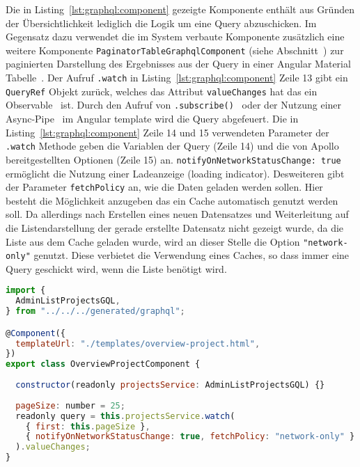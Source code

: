 Die in Listing~\ref{lst:graphql:component} gezeigte Komponente enthält aus Gründen der Übersichtlichkeit lediglich die Logik um eine Query abzuschicken. Im Gegensatz dazu verwendet die im System verbaute Komponente zusätzlich eine weitere Komponente \lstinline|PaginatorTableGraphqlComponent| (siehe Abschnitt~) zur paginierten Darstellung des Ergebnisses aus der Query in einer Angular Material Tabelle~\cite{angular-material-table}.
Der Aufruf \lstinline|.watch| in Listing~\ref{lst:graphql:component} Zeile 13 gibt ein \lstinline|QueryRef| Objekt zurück, welches das Attribut \lstinline|valueChanges| hat das ein Observable~\cite{angular-observable} ist.
Durch den Aufruf von \lstinline|.subscribe()|~\cite{angular-subscribe} oder der Nutzung einer Async-Pipe~\cite{angular-async-pipe} im Angular template wird die Query abgefeuert.
Die in Listing~\ref{lst:graphql:component} Zeile 14 und 15 verwendeten Parameter der \lstinline|.watch| Methode geben die Variablen der Query (Zeile 14) und die von Apollo bereitgestellten Optionen (Zeile 15) an.
\lstinline|notifyOnNetworkStatusChange: true| ermöglicht die Nutzung einer Ladeanzeige (loading indicator). Desweiteren gibt der Parameter \lstinline|fetchPolicy| an, wie die Daten geladen werden sollen. Hier besteht die Möglichkeit anzugeben das ein Cache automatisch genutzt werden soll. Da allerdings nach Erstellen eines neuen Datensatzes und Weiterleitung auf die Listendarstellung der gerade erstellte Datensatz nicht gezeigt wurde, da die Liste aus dem Cache geladen wurde, wird an dieser Stelle die Option \lstinline|"network-only"| genutzt. Diese verbietet die Verwendung eines Caches, so dass immer eine Query geschickt wird, wenn die Liste benötigt wird.

\begin{lstlisting}[language=JavaScript,float=h!,caption={Angular Komponente zum Anzeigen der Projekte in Listendarstellung}, label={lst:graphql:component}]
import {
  AdminListProjectsGQL,
} from "../../../generated/graphql";

@Component({
  templateUrl: "./templates/overview-project.html",
})
export class OverviewProjectComponent {  
  
  constructor(readonly projectsService: AdminListProjectsGQL) {}
  
  pageSize: number = 25;
  readonly query = this.projectsService.watch(
    { first: this.pageSize },
    { notifyOnNetworkStatusChange: true, fetchPolicy: "network-only" }
  ).valueChanges;
}
\end{lstlisting}

